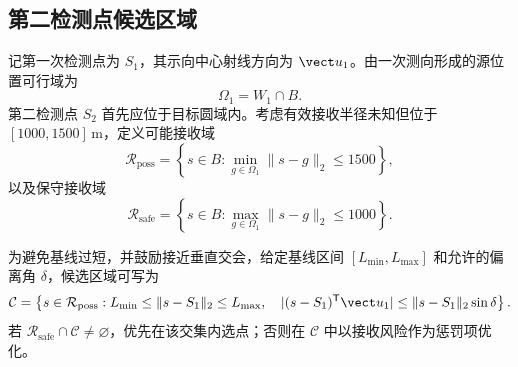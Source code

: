 \subsection{第二检测点候选区域}

记第一次检测点为 \(S_1\)，其示向中心射线方向为 \(\vect u_1\)。由一次测向形成的源位置可行域为
\begin{equation}
  \Omega_1=W_1\cap B.
\end{equation}
第二检测点 \(S_2\) 首先应位于目标圆域内。考虑有效接收半径未知但位于 \([1000,1500]\,\mathrm{m}\)，定义可能接收域
\begin{equation}
  \mathcal{R}_{\mathrm{poss}}
  =\left\{s\in B:\min_{g\in\Omega_1}\|s-g\|_2\le1500\right\},
\end{equation}
以及保守接收域
\begin{equation}
  \mathcal{R}_{\mathrm{safe}}
  =\left\{s\in B:\max_{g\in\Omega_1}\|s-g\|_2\le1000\right\}.
\end{equation}

为避免基线过短，并鼓励接近垂直交会，给定基线区间 \([L_{\min},L_{\max}]\) 和允许的偏离角 \(\delta\)，候选区域可写为
\begin{equation}
  \mathcal{C}=\left\{s\in\mathcal{R}_{\mathrm{poss}}:
  L_{\min}\le\|s-S_1\|_2\le L_{\max},\quad
  |(s-S_1)^{\mathsf T}\vect u_1|
  \le\|s-S_1\|_2\sin\delta\right\}.
  \label{eq:candidate-region}
\end{equation}
若 \(\mathcal{R}_{\mathrm{safe}}\cap\mathcal{C}\neq\varnothing\)，优先在该交集内选点；否则在 \(\mathcal{C}\) 中以接收风险作为惩罚项优化。
